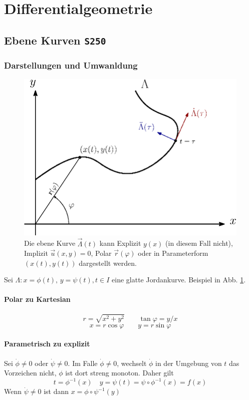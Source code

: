 \documentclass[margin=small, twocolumn]{hsrzf}
\numberwithin{equation}{subsection}
\newcommand{\brpage}[1]{\textcolor{red!70!black}{\small\texttt{S#1}}}
\begin{document}

\section{Differentialgeometrie}
\subsection{Ebene Kurven \brpage{250}}

\subsubsection{Darstellungen und Umwanldung}
\begin{figure}[h]
\centering
\includegraphics[width=.9\linewidth]{fig/plane-curve.eps}
\caption{Die ebene Kurve \(\vec{\Lambda}(t)\) kann Explizit \(y(x)\) (in diesem Fall nicht), Implizit \(\vec{u}(x,y) = 0\), Polar \(\vec{r}(\varphi)\) oder in Parameterform \((x(t), y(t))\) dargestellt werden.}
\label{fig:plane-curve}
\end{figure}

Sei \(\Lambda: x = \phi(t),\, y = \psi(t), t\in I\) eine glatte Jordankurve.
Beispiel in Abb. \ref{fig:plane-curve}.

\paragraph{Polar zu Kartesian}
\[
    r = \sqrt{x^2 + y^2}
    \qquad
    \tan\varphi = y/x
\]
\[
    x = r \cos\varphi
    \qquad
    y = r \sin\varphi
\]

\paragraph{Parametrisch zu explizit}
Sei \(\dot{\phi} \neq 0\) oder \(\dot{\psi} \neq 0\). Im Falle \(\dot{\phi} \neq 0\), wechselt \(\dot\phi\) in der Umgebung von \(t\) das Vorzeichen nicht, \(\phi\) ist dort streng monoton.
Daher gilt
\[
    t = \phi^{-1}(x) \quad y = \psi(t) = \psi \circ \phi^{-1}(x) = f(x)
\]
Wenn \(\dot{\psi} \neq 0\) ist dann \(x = \phi \circ \psi^{-1}(y)\)
\end{document}
